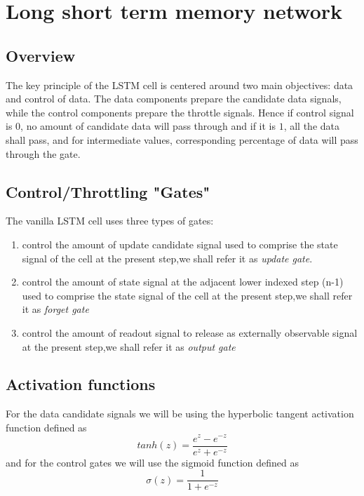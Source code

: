 \documentclass[12pt,a4paper]{article}
\begin{document}
{\section{Long short term memory network}
\subsection{Overview}
The key principle of the LSTM cell is centered around two main objectives: data and control of data. The data components prepare the candidate data signals, while the control components prepare the throttle signals. Hence if control signal is $0$, no amount of candidate data will pass through and if it is $1$, all the data shall pass, and for intermediate values, corresponding percentage of data will pass through the gate.
\subsection{Control/Throttling "Gates"}
The vanilla LSTM cell uses three types of gates:
\begin{enumerate}
    \item control the amount of update candidate signal used to comprise the state signal of the cell at the present step,we shall refer it as \textit{update gate}.
    \item control the amount of state signal at the adjacent lower indexed step (n-1)  used to comprise the state signal of the cell at the present step,we shall refer it as \textit{forget gate}
    \item control the amount of readout signal to release as externally observable signal at the present step,we shall refer it as \textit{output gate}
\end{enumerate}
\subsection{Activation functions}
For the data candidate signals we will be using the hyperbolic tangent activation function defined as
\[
tanh(z) = \frac{e^{z}-e^{-z}}{e^{z}+e^{-z}}\tag{33}
\]
and for the control gates we will use the sigmoid function defined as
\[
\sigma(z) = \frac{1}{1+e^{-z}}\tag{34}
\]
}
\end{document}
